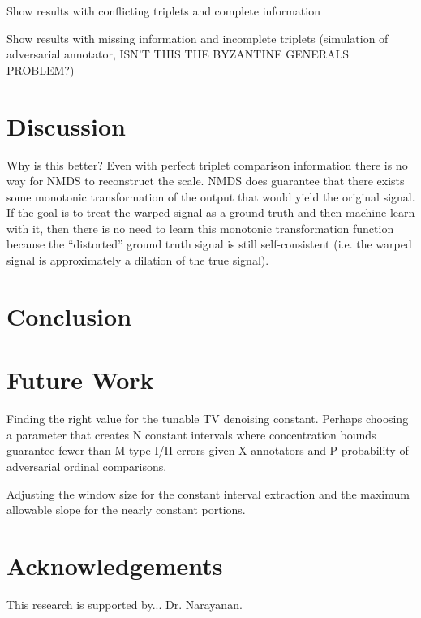 \documentclass[]{article}
\begin{document}
Show results with conflicting triplets and complete information

Show results with missing information and incomplete triplets (simulation of adversarial annotator, ISN'T THIS THE BYZANTINE GENERALS PROBLEM?)

\section{Discussion}
Why is this better?  Even with perfect triplet comparison information there is no way for NMDS to reconstruct the scale.  NMDS does guarantee that there exists some monotonic transformation of the output that would yield the original signal.  If the goal is to treat the warped signal as a ground truth and then machine learn with it, then there is no need to learn this monotonic transformation function because the ``distorted'' ground truth signal is still self-consistent (i.e. the warped signal is approximately a dilation of the true signal).

\section{Conclusion}

\section{Future Work}
Finding the right value for the tunable TV denoising constant.  Perhaps choosing a parameter that creates N constant intervals where concentration bounds guarantee fewer than M type I/II errors given X annotators and P probability of adversarial ordinal comparisons.

Adjusting the window size for the constant interval extraction and the maximum allowable slope for the nearly constant portions.

\section{Acknowledgements}
This research is supported by... Dr. Narayanan.


\end{document}
